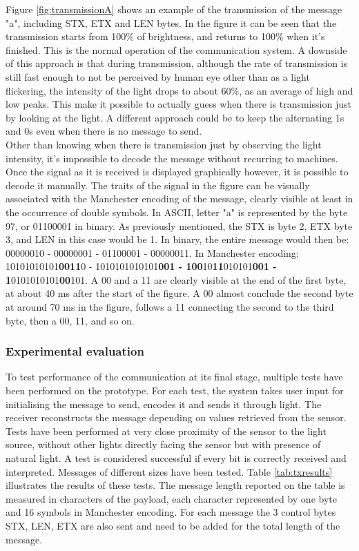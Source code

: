 Figure \ref{fig:transmissionA} shows an example of the transmission of the message "a", including STX, ETX and LEN bytes.
In the figure it can be seen that the transmission starts from 100\% of brightness, and returns to 100\% when it's finished. 
This is the normal operation of the communication system.
A downside of this approach is that during transmission, although the rate of transmission is still fast enough to not be perceived by human eye other than as a light flickering, the intensity of the light drops to about 60\%, as an average of high and low peaks.
This make it possible to actually guess when there is transmission just by looking at the light.
A different approach could be to keep the alternating 1s and 0s even when there is no message to send.\\
Other than knowing when there is transmission just by observing the light intensity, it's impossible to decode the message without recurring to machines.
Once the signal as it is received is displayed graphically however, it is possible to decode it manually.
The traits of the signal in the figure can be visually associated with the Manchester encoding of the message, clearly visible at least in the occurrence of double symbols. 
In ASCII, letter "a" is represented by the byte 97, or 01100001 in binary.
As previously mentioned, the STX is byte 2, ETX byte 3, and LEN in this case would be 1.
In binary, the entire message would then be: 00000010 - 00000001 - 01100001 - 00000011.
In Manchester encoding: 10101010101\textbf{0011}0 - 1010101010101\textbf{001 - 100}10\textbf{11}010101\textbf{001 - 1}0101010101\textbf{00}101.
A 00 and a 11 are clearly visible at the end of the first byte, at about 40 ms after the start of the figure.
 A 00 almost conclude the second byte at around 70 ms in the figure, follows a 11 connecting the second to the third byte, then a 00, 11, and so on.
 

\subsubsection{Experimental evaluation}
To test performance of the communication at its final stage, multiple tests have been performed on the prototype.
For each test, the system takes user input for initialising the message to send, encodes it and sends it through light. 
The receiver reconstructs the message depending on values retrieved from the sensor.
Tests have been performed at very close proximity of the sensor to the light source, without other lights directly facing the sensor but with presence of natural light.
A test is considered successful if every bit is correctly received and interpreted.
Messages of different sizes have been tested.
Table \ref{tab:txresults} illustrates the results of these tests.
The message length reported on the table is measured in characters of the payload, each character represented by one byte and 16 symbols in Manchester encoding.
For each message the 3 control bytes STX, LEN, ETX are also sent and need to be added for the total length of the message.

